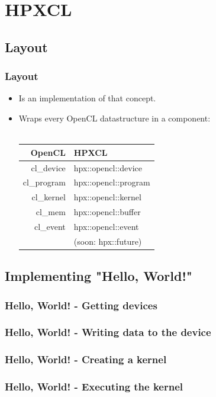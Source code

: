 \documentclass{beamer}
\begin{document}
\section{HPXCL}
\subsection{Layout}
\begin{frame}
    \frametitle{Layout}
    \begin{itemize}
        \item Is an implementation of that concept.
        \item Wraps every OpenCL datastructure in a component:
            \\~\\
            \begin{tabular}{ r || l }
                OpenCL       & HPXCL                \\
                \hline
                cl\_device   & hpx::opencl::device  \\
                cl\_program  & hpx::opencl::program \\
                cl\_kernel   & hpx::opencl::kernel  \\
                cl\_mem      & hpx::opencl::buffer  \\
                cl\_event    & hpx::opencl::event   \\
                ~            & (soon: hpx::future)  \\
            \end{tabular}
    \end{itemize}
\end{frame}


\subsection{Implementing "Hello, World!"}
\begin{frame}
    \frametitle{Hello, World! - Getting devices}
\end{frame}

\begin{frame}
    \frametitle{Hello, World! - Writing data to the device}
\end{frame}

\begin{frame}
    \frametitle{Hello, World! - Creating a kernel}
\end{frame}

\begin{frame}
    \frametitle{Hello, World! - Executing the kernel}
\end{frame}
\end{document}
